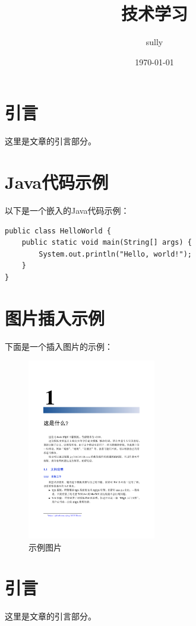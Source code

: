 \documentclass[10pt]{article}
\title{技术学习}
\author{sully}
\date{\today}
\begin{document}
\maketitle

\tableofcontents
\newpage

\section{引言}
这里是文章的引言部分。

\section{Java代码示例}
以下是一个嵌入的Java代码示例：

\begin{lstlisting}[style=java, caption={HelloWorld.java}]
public class HelloWorld {
    public static void main(String[] args) {
        System.out.println("Hello, world!");
    }
}
\end{lstlisting}

\section{图片插入示例}
下面是一个插入图片的示例：

\begin{figure}[h]
    \centering
    \includegraphics[width=0.5\textwidth]{9.png} %
    \caption{示例图片}
    \label{fig:example}
\end{figure}


\newpage
\section{引言}
这里是文章的引言部分。
\end{document}

